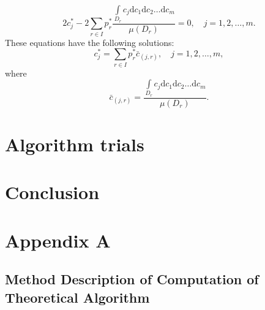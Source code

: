 \begin{equation}
2 c_{j}^{*} - 2 \sum\limits_{r \in I} p_{r}^{*}\frac{\int\limits_{D_{r}} c_{j}\mathrm{d}c_{1}\mathrm{d}c_{2}\dots\mathrm{d}c_{m}}{\mu(D_{r})} = 0, \quad j = 1,2,\dots,m.
\end{equation}
These equations have the following solutions:
\begin{equation}
c_{j}^{*} = \sum\limits_{r \in I} p_{r}^{*} \bar{c}_{(j,r)}, \quad j = 1,2,\dots,m, \label{eq-solutions-to-cj*}
\end{equation}
where
\begin{equation}
\bar{c}_{(j,r)} = \frac{\int\limits_{D_{r}} c_{j}\mathrm{d}c_{1}\mathrm{d}c_{2}\dots\mathrm{d}c_{m}}{\mu(D_{r})}. \label{eq-cbar}
\end{equation}

\section{Algorithm trials}

\newpage
\section{Conclusion}


\newpage

\section{Appendix A}
\subsection{Method Description of Computation of Theoretical Algorithm}

